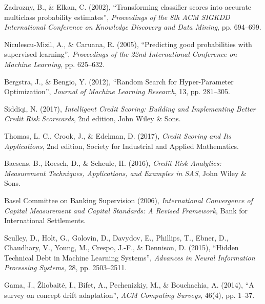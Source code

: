 \begin{enumerate}[label={[\arabic*]}, ref=\arabic*, leftmargin=*, labelsep=0.6em,
                  itemsep=5pt, start=8]
\item\label{ref:zadrozny2002} Zadrozny, B., \& Elkan, C. (2002), ``Transforming
classifier scores into accurate multiclass probability estimates'',
\textit{Proceedings of the 8th ACM SIGKDD International Conference on Knowledge
Discovery and Data Mining}, pp. 694--699.

\item\label{ref:niculescu2005} Niculescu-Mizil, A., \& Caruana, R. (2005),
``Predicting good probabilities with supervised learning'', \textit{Proceedings of
the 22nd International Conference on Machine Learning}, pp. 625--632.

\item\label{ref:bergstra2012} Bergstra, J., \& Bengio, Y. (2012), ``Random Search
for Hyper-Parameter Optimization'', \textit{Journal of Machine Learning
Research}, 13, pp. 281--305.

\item\label{ref:siddiqi2017} Siddiqi, N. (2017), \textit{Intelligent Credit
Scoring: Building and Implementing Better Credit Risk Scorecards}, 2nd edition,
John Wiley \& Sons.

\item\label{ref:thomas2017} Thomas, L. C., Crook, J., \& Edelman, D. (2017),
\textit{Credit Scoring and Its Applications}, 2nd edition, Society for Industrial
and Applied Mathematics.

\item\label{ref:baesens2016} Baesens, B., Roesch, D., \& Scheule, H. (2016),
\textit{Credit Risk Analytics: Measurement Techniques, Applications, and Examples
in SAS}, John Wiley \& Sons.

\item\label{ref:bcbs2006} Basel Committee on Banking Supervision (2006),
\textit{International Convergence of Capital Measurement and Capital Standards: A
Revised Framework}, Bank for International Settlements.

\item\label{ref:sculley2015} Sculley, D., Holt, G., Golovin, D., Davydov, E.,
Phillips, T., Ebner, D., Chaudhary, V., Young, M., Crespo, J.-F., \& Dennison, D.
(2015), ``Hidden Technical Debt in Machine Learning Systems'', \textit{Advances in
Neural Information Processing Systems}, 28, pp. 2503--2511.

\item\label{ref:gama2014} Gama, J., Žliobaitė, I., Bifet, A., Pechenizkiy, M., \&
Bouchachia, A. (2014), ``A survey on concept drift adaptation'', \textit{ACM
Computing Surveys}, 46(4), pp. 1--37.


\end{enumerate}
